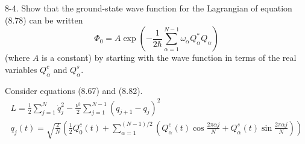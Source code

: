 \documentclass[12pt]{article}
\begin{document}
8-4.
Show that the ground-state wave function for the Lagrangian of
equation (8.78) can be written
\begin{equation*}
\Phi_0=A\exp\left(
-\frac{1}{2\hbar}
\sum_{\alpha=1}^{N-1}
\omega_\alpha Q_\alpha^*Q_\alpha
\right)
\tag{8.83}
\end{equation*}
(where $A$ is a constant) by starting with the wave function in terms of
the real variables $Q_\alpha^c$ and $Q_\alpha^s$.

\bigskip
Consider equations (8.67) and (8.82).
\begin{gather*}
L=\frac{1}{2}\sum_{j=1}^N\dot q_j^2
-\frac{\nu^2}{2}\sum_{j=1}^{N-1}(q_{j+1}-q_j)^2
\tag{8.67}
\\
q_j(t)=
\sqrt{\frac{2}{N}}\left(
\frac{1}{2}Q_0^c(t)
+\sum_{\alpha=1}^{(N-1)/2}
\left(
Q_\alpha^c(t)\cos\frac{2\pi\alpha j}{N}
+Q_\alpha^s(t)\sin\frac{2\pi\alpha j}{N}
\right)
\right)
\tag{8.82}
\end{gather*}
\end{document}

